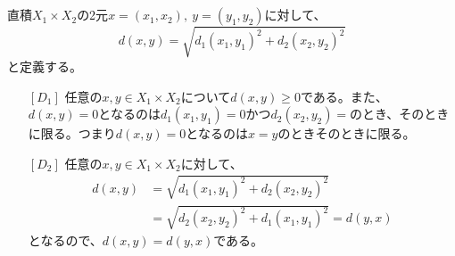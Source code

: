 \documentclass{jsarticle}
\begin{document}
\subsection{}
直積$X_1\times X_2$の2元$x=(x_1,x_2),\ y=(y_1,y_2)$に対して、
\[d(x,y)=\sqrt{{d_1(x_1,y_1)}^2+{d_2(x_2,y_2)}^2}\]
と定義する。
\begin{enumerate}
\item[{$[D_1]$}] 
任意の$x,y\in X_1\times X_2$について$d(x,y)\geq 0$である。また、$d(x,y)=0$となるのは$d_1(x_1,y_1)=0$かつ$d_2(x_2,y_2)=$のとき、そのときに限る。つまり$d(x,y)=0$となるのは$x=y$のときそのときに限る。
\item[{$[D_2]$}]
任意の$x,y\in X_1\times X_2$に対して、
\begin{align*}
d(x,y)&=\sqrt{{d_1(x_1,y_1)}^2+{d_2(x_2,y_2)}^2}\\
&=\sqrt{{d_2(x_2,y_2)}^2+{d_1(x_1,y_1)}^2}=d(y,x)
\end{align*}
となるので、$d(x,y)=d(y,x)$である。


\end{enumerate}
\end{document}
